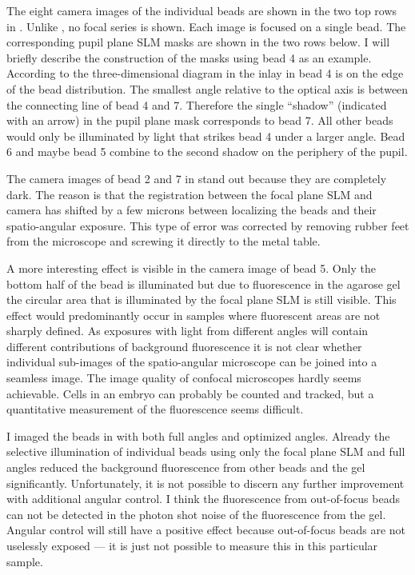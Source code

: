 The eight camera images of the individual beads are shown in the two
top rows in . Unlike , no focal
series is shown. Each image is focused on a single bead. The
corresponding pupil plane SLM masks are shown in the two rows below. I
will briefly describe  the
construction of the masks using bead 4 as an example. According to the
three-dimensional diagram in the inlay in  bead 4 is
on the edge of the bead distribution. The smallest angle relative to
the optical axis is between the connecting line of bead 4 and
7. Therefore the single ``shadow'' (indicated with an arrow) in the
pupil plane mask corresponds to bead 7. All other beads would only be
illuminated by light that strikes bead 4 under a larger angle. Bead 6
and maybe bead 5 combine to the second shadow on the periphery of the
pupil.

The  camera images of bead 2 and 7 in
 stand out because they are completely dark. The
reason is that the registration between the focal plane SLM and camera
has shifted by a few microns between localizing the beads and their
spatio-angular exposure. This type of error was corrected by removing
rubber feet from the microscope and screwing it directly to the metal
table.

 

A  more interesting effect is visible in the camera
image of bead 5. Only the bottom half of the bead is illuminated but
due to fluorescence in the agarose gel the circular area that is
illuminated by the focal plane SLM is still visible. This effect would
predominantly occur in samples where fluorescent areas are not sharply
defined. As exposures with light from different angles will contain
different contributions of background fluorescence it is not clear
whether individual sub-images of the spatio-angular microscope can be
joined into a seamless image. The image quality of confocal
microscopes hardly seems achievable. Cells in an embryo can probably
be counted and tracked, but a quantitative measurement of the
fluorescence seems difficult.

I  imaged the
beads in  with both full angles and optimized
angles. Already the selective illumination of individual beads using
only the focal plane SLM and full angles reduced the background
fluorescence from other beads and the gel
significantly. Unfortunately, it is not possible to discern any
further improvement with additional angular control.  I think the
fluorescence from out-of-focus beads can not be detected in the photon
shot noise of the fluorescence from the gel. Angular control will
still have a positive effect because out-of-focus beads are not
uselessly exposed --- it is just not possible to measure this in this
particular sample.

